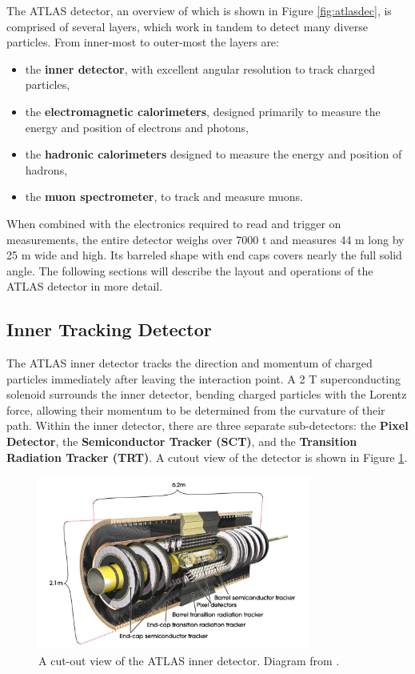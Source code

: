 The ATLAS detector, an overview of which is shown in Figure \ref{fig:atlasdec}, is comprised of several layers, which work in tandem to detect many diverse particles. From inner-most to outer-most the layers are:

\begin{itemize}
    \item the \textbf{inner detector}, with excellent angular resolution to track charged particles,
    \item the \textbf{electromagnetic calorimeters}, designed primarily to measure the energy and position of electrons and photons,
    \item the \textbf{hadronic calorimeters} designed to measure the energy and position of hadrons,
    \item the \textbf{muon spectrometer}, to track and measure muons.
\end{itemize}

When combined with the electronics required to read and trigger on measurements, the entire detector weighs over 7000 t and measures 44 m long by 25 m wide and high. Its barreled shape with end caps covers nearly the full solid angle. The following sections will describe the layout and operations of the ATLAS detector in more detail.

\subsection{Inner Tracking Detector}
The ATLAS inner detector tracks the direction and momentum of charged particles immediately after leaving the interaction point. A 2 T superconducting solenoid surrounds the inner detector, bending charged particles with the Lorentz force, allowing their momentum to be determined from the curvature of their path. Within the inner detector, there are three separate sub-detectors: the \textbf{Pixel Detector}, the \textbf{Semiconductor Tracker (SCT)}, and the \textbf{Transition Radiation Tracker (TRT)}. A cutout view of the detector is shown in Figure \ref{fig:atlasinner}.

\begin{figure}[H]
    \centering
    \includegraphics[width=0.8\textwidth]{Figures/2/InnerDetector.png}
    \caption{A cut-out view of the ATLAS inner detector. Diagram from \cite{ATLASDesign}.}
    \label{fig:atlasinner}
\end{figure}

